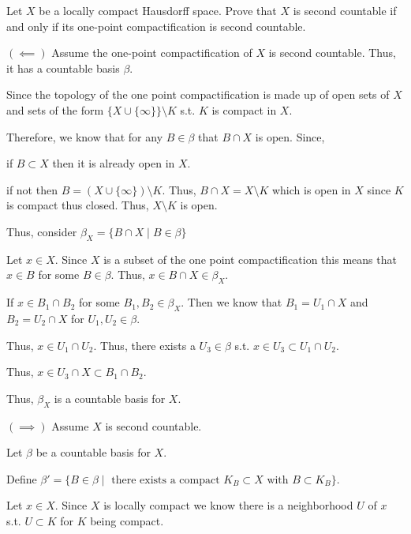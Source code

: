 \documentclass[12pt, letterpaper]{article}
\renewcommand{\t}[1]{\text{#1}}
\begin{document}
\color{\TextColor}
\pagecolor{\colormode}
\setlength{\parindent}{0pt}
\pagestyle{fancy}
\fancyhf{}
\fancyhead[ROE]{\color{\TextColor}\thepage}
\begin{problem}{}
    Let $X$ be a locally compact Hausdorff space. Prove that $X$ is
  second countable if and only if its one-point compactification is
  second countable.
\end{problem}
\begin{problemproof}
    $(\impliedby)$ Assume the one-point compactification of $X$ is second countable. Thus, it has a countable basis $\beta$.

    Since the topology of the one point compactification is made up of open sets of $X$ and sets of the form $\{X \cup \{\infty\}\} \setminus K$ s.t. $K$ is compact in $X$.

    Therefore, we know that for any $B \in \beta$ that $B \cap X$ is open. Since,

    if $B \subset X$ then it is already open in $X$.

    if not then $B=(X \cup \{\infty\}) \setminus K$. Thus, $B \cap X=X \setminus K$ which is open in $X$ since $K$ is compact thus closed. Thus, $X \setminus K$ is open.

    Thus, consider $\beta_X=\{B \cap X \mid B \in \beta\}$

    Let $x \in X$. Since $X$ is a subset of the one point compactification this means that $x \in B$ for some $B \in \beta$. Thus, $x \in B \cap X \in \beta_X$.

    If $x \in B_1 \cap B_2$ for some $B_1,B_2 \in \beta_X$. Then we know that $B_1=U_1 \cap X$ and $B_2=U_2 \cap X$ for $U_1,U_2 \in \beta$.

    Thus, $x \in U_1 \cap U_2$. Thus, there exists a $U_3 \in \beta$ s.t. $x \in U_3 \subset U_1 \cap U_2$.

    Thus, $x \in U_3 \cap X \subset B_1 \cap B_2$.

    Thus, $\beta_X$ is a countable basis for $X$.

    $(\implies)$ Assume $X$ is second countable.

    Let $\beta$ be a countable basis for $X$. 
    
    Define $\beta'=\{B \in \beta \mid \t{ there exists a compact } K_B \subset X \t{ with } B \subset K_B\}$.

    Let $x \in X$. Since $X$ is locally compact we know there is a neighborhood $U$ of $x$ s.t. $U \subset K$ for $K$ being compact.


\end{problemproof}
\end{document}
